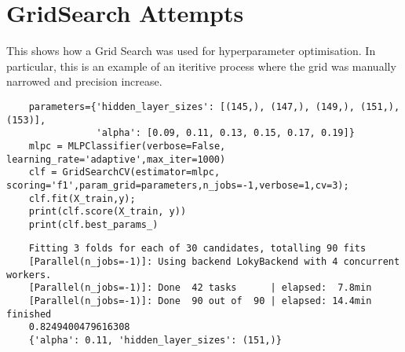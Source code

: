 \documentclass{UoNMCHA}
\numberwithin{equation}{section}
\begin{document}
\section{GridSearch Attempts}\label{apx:GSAttempt}
This shows how a Grid Search was used for hyperparameter optimisation. In particular, this is an example of an iteritive process where the grid was manually narrowed and precision increase. 
\begin{lstlisting}
    parameters={'hidden_layer_sizes': [(145,), (147,), (149,), (151,), (153)],
                'alpha': [0.09, 0.11, 0.13, 0.15, 0.17, 0.19]}
    mlpc = MLPClassifier(verbose=False, learning_rate='adaptive',max_iter=1000)
    clf = GridSearchCV(estimator=mlpc, scoring='f1',param_grid=parameters,n_jobs=-1,verbose=1,cv=3);
    clf.fit(X_train,y);
    print(clf.score(X_train, y))
    print(clf.best_params_)
\end{lstlisting}
\begin{lstlisting}
    Fitting 3 folds for each of 30 candidates, totalling 90 fits
    [Parallel(n_jobs=-1)]: Using backend LokyBackend with 4 concurrent workers.
    [Parallel(n_jobs=-1)]: Done  42 tasks      | elapsed:  7.8min
    [Parallel(n_jobs=-1)]: Done  90 out of  90 | elapsed: 14.4min finished
    0.8249400479616308
    {'alpha': 0.11, 'hidden_layer_sizes': (151,)}
\end{lstlisting}
\end{document}
